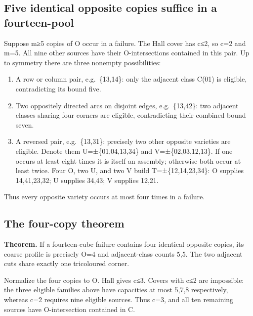 \documentclass[
  10pt,
]{article}
\providecommand{\tightlist}{%
  \setlength{\itemsep}{0pt}\setlength{\parskip}{0pt}}
\begin{document}
\hypertarget{five-identical-opposite-copies-suffice-in-a-fourteen-pool}{%
\subsection*{Five identical opposite copies suffice in a
fourteen-pool}\label{five-identical-opposite-copies-suffice-in-a-fourteen-pool}}

Suppose m≥5 copies of O occur in a failure. The Hall cover has c≤2, so
c=2 and m=5. All nine other sources have their O-intersections contained
in this pair. Up to symmetry there are three nonempty possibilities:

\begin{enumerate}
\def\labelenumi{\arabic{enumi}.}
\tightlist
\item
  A row or column pair, e.g.~\{13,14\}: only the adjacent class C(01) is
  eligible, contradicting its bound five.
\item
  Two oppositely directed arcs on disjoint edges, e.g.~\{13,42\}: two
  adjacent classes sharing four corners are eligible, contradicting
  their combined bound seven.
\item
  A reversed pair, e.g.~\{13,31\}: precisely two other opposite
  varieties are eligible. Denote them U=±\{01,04,13,34\} and
  V=±\{02,03,12,13\}. If one occurs at least eight times it is itself an
  assembly; otherwise both occur at least twice. Four O, two U, and two
  V build T=±\{12,14,23,34\}: O supplies 14,41,23,32; U supplies 34,43;
  V supplies 12,21.
\end{enumerate}

Thus every opposite variety occurs at most four times in a failure.

\hypertarget{the-four-copy-theorem}{%
\subsection*{The four-copy theorem}\label{the-four-copy-theorem}}

\textbf{Theorem.} If a fourteen-cube failure contains four identical
opposite copies, its coarse profile is precisely O=4 and adjacent-class
counts 5,5. The two adjacent cuts share exactly one tricoloured corner.

Normalize the four copies to O. Hall gives c≤3. Covers with c≤2 are
impossible: the three eligible families above have capacities at most
5,7,8 respectively, whereas c=2 requires nine eligible sources. Thus
c=3, and all ten remaining sources have O-intersection contained in C.
\end{document}
